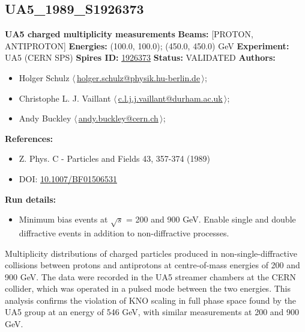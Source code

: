 \clearpage


\clearpage

\subsection[UA5\_1989\_S1926373]{UA5\_1989\_S1926373\,\cite{Ansorge:1988kn}}
\textbf{UA5 charged multiplicity measurements}\newline
\textbf{Beams:} [PROTON, ANTIPROTON] \newline
\textbf{Energies:} (100.0, 100.0); (450.0, 450.0) GeV \newline
\textbf{Experiment:} UA5 (CERN SPS) \newline
\textbf{Spires ID:} \href{http://www.slac.stanford.edu/spires/find/hep/www?rawcmd=key+1926373}{1926373}\newline
\textbf{Status:} VALIDATED\newline
\textbf{Authors:}
\begin{itemize}
  \item Holger Schulz $\langle\,$\href{mailto:holger.schulz@physik.hu-berlin.de}{holger.schulz@physik.hu-berlin.de}$\,\rangle$;
  \item Christophe L. J. Vaillant $\langle\,$\href{mailto:c.l.j.j.vaillant@durham.ac.uk}{c.l.j.j.vaillant@durham.ac.uk}$\,\rangle$;
  \item Andy Buckley $\langle\,$\href{mailto:andy.buckley@cern.ch}{andy.buckley@cern.ch}$\,\rangle$;
\end{itemize}
\textbf{References:}
\begin{itemize}
  \item Z. Phys. C - Particles and Fields 43, 357-374 (1989)
  \item DOI: \href{http://dx.doi.org/10.1007/BF01506531}{10.1007/BF01506531}
\end{itemize}
\textbf{Run details:}
\begin{itemize}

  \item Minimum bias events at \ensuremath{\sqrt{s}} = 200 and 900 GeV. Enable single and double diffractive events in addition to non-diffractive processes.\end{itemize}

\noindent Multiplicity distributions of charged particles produced in non-single-diffractive collisions between protons and antiprotons at centre-of-mass energies of 200 and 900 GeV. The data were recorded in the UA5 streamer chambers at the CERN collider, which was operated in a pulsed mode between the two energies. This analysis confirms the violation of KNO scaling in full phase space found by the UA5 group at an energy of 546 GeV, with similar measurements at 200 and 900 GeV.

